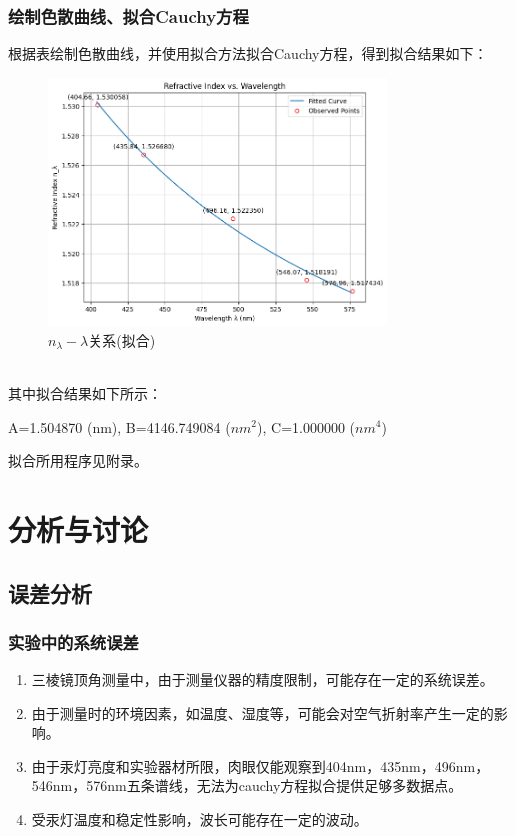\documentclass[UTF8]{ctexart}
\begin{document}
\subsubsection{绘制色散曲线、拟合Cauchy方程}
根据表绘制色散曲线，并使用拟合方法拟合Cauchy方程，得到拟合结果如下：
\\
\begin{figure}[h]
    \centering
    \includegraphics[width=0.8\textwidth]{fit.png}
    \caption{\(n_\lambda - \lambda\)关系(拟合)}
    \label{fig:fit}
\end{figure}
\\
其中拟合结果如下所示：
\begin{center}
    A=1.504870 (nm), B=4146.749084 (\(nm^2\)), C=1.000000 (\(nm^4\))
\end{center}
拟合所用程序见附录。
\section{分析与讨论}

\subsection{误差分析}

\subsubsection{实验中的系统误差}
\begin{enumerate}
    \item 三棱镜顶角测量中，由于测量仪器的精度限制，可能存在一定的系统误差。
    \item 由于测量时的环境因素，如温度、湿度等，可能会对空气折射率产生一定的影响。
    \item 由于汞灯亮度和实验器材所限，肉眼仅能观察到404nm，435nm，496nm，546nm，576nm五条谱线，无法为cauchy方程拟合提供足够多数据点。
    \item 受汞灯温度和稳定性影响，波长可能存在一定的波动。
\end{enumerate}
\end{document}
